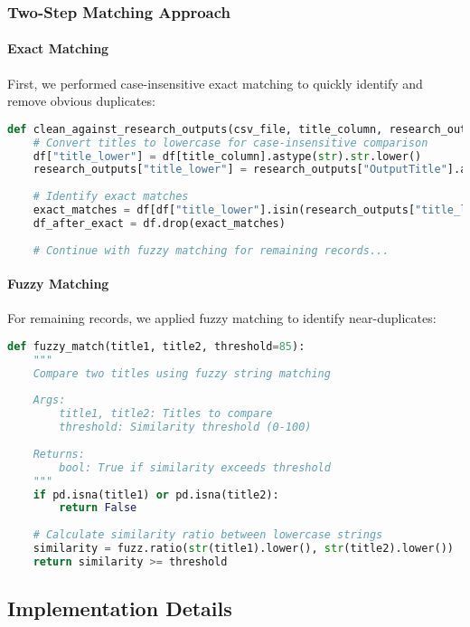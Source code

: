 \documentclass[12pt]{article}
\begin{document}
\subsubsection{Two-Step Matching Approach}

\paragraph{Exact Matching}
First, we performed case-insensitive exact matching to quickly identify and remove obvious duplicates:

\begin{lstlisting}[language=Python]
def clean_against_research_outputs(csv_file, title_column, research_outputs, threshold=85):
    # Convert titles to lowercase for case-insensitive comparison
    df["title_lower"] = df[title_column].astype(str).str.lower()
    research_outputs["title_lower"] = research_outputs["OutputTitle"].astype(str).str.lower()
    
    # Identify exact matches
    exact_matches = df[df["title_lower"].isin(research_outputs["title_lower"])].index
    df_after_exact = df.drop(exact_matches)
    
    # Continue with fuzzy matching for remaining records...
\end{lstlisting}

\paragraph{Fuzzy Matching}
For remaining records, we applied fuzzy matching to identify near-duplicates:

\begin{lstlisting}[language=Python]
def fuzzy_match(title1, title2, threshold=85):
    """
    Compare two titles using fuzzy string matching
    
    Args:
        title1, title2: Titles to compare
        threshold: Similarity threshold (0-100)
        
    Returns:
        bool: True if similarity exceeds threshold
    """
    if pd.isna(title1) or pd.isna(title2):
        return False
        
    # Calculate similarity ratio between lowercase strings
    similarity = fuzz.ratio(str(title1).lower(), str(title2).lower())
    return similarity >= threshold
\end{lstlisting}

\subsection{Implementation Details}
\end{document}
